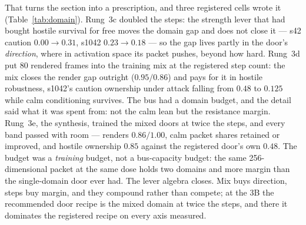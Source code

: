 \documentclass[11pt]{article}
\begin{document}
That turns the section into a prescription, and three registered cells
wrote it (Table~\ref{tab:domain}). Rung~3c doubled the steps: the
strength lever that had bought hostile survival for free moves the
domain gap and does not close it --- s42 caution $0.00\to0.31$, s1042
$0.23\to0.18$ --- so the gap lives partly in the door's
\emph{direction}, where in activation space its packet pushes, beyond
how hard. Rung~3d put 80 rendered frames into the training mix at the
registered step count: the mix closes the render gap outright ($0.95 /
0.86$) and pays for it in hostile robustness, s1042's caution ownership
under attack falling from $0.48$ to $0.125$ while calm conditioning
survives. The bus had a domain budget, and the detail said what it was
spent from: not the calm lean but the resistance margin. Rung~3e, the
synthesis, trained the mixed doors at twice the steps, and every band
passed with room --- renders $0.86 / 1.00$, calm packet shares retained
or improved, and hostile ownership $0.85$ against the registered door's
own $0.48$. The budget was a \emph{training} budget, not a bus-capacity
budget: the same 256-dimensional packet at the same dose holds two
domains and more margin than the single-domain door ever had. The lever
algebra closes. Mix buys direction, steps buy margin, and they compound
rather than compete; at the 3B the recommended door recipe is the
mixed domain at twice the steps, and there it dominates the registered
recipe on every axis measured.
\end{document}
